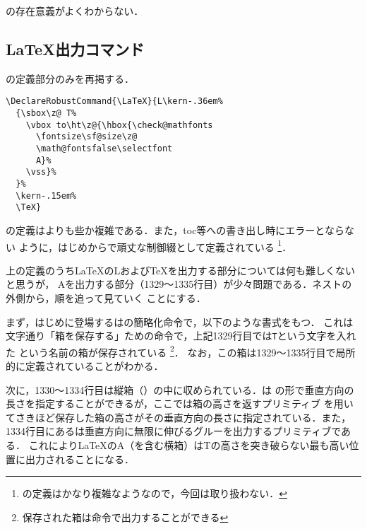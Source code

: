 \documentclass[autodetect-engine,dvipdfmx]{jsarticle}
\begin{document}
\begin{question}
の存在意義がよくわからない．
\end{question}


\newpage

\subsection{\LaTeX 出力コマンド}

の定義部分のみを再掲する．

\begin{lstlisting}[firstnumber=1328]
\DeclareRobustCommand{\LaTeX}{L\kern-.36em%
  {\sbox\z@ T%
    \vbox to\ht\z@{\hbox{\check@mathfonts
      \fontsize\sf@size\z@
      \math@fontsfalse\selectfont
      A}%
    \vss}%
  }%
  \kern-.15em%
  \TeX}
\end{lstlisting}

の定義はよりも些か複雑である．また，toc等への書き出し時にエラーとならない
ように，はじめからで頑丈な制御綴として定義されている
\footnote{の定義はかなり複雑なようなので，今回は取り扱わない．}．

上の定義のうち\LaTeX のLおよび\TeX を出力する部分については何も難しくないと思うが，
Aを出力する部分（1329〜1335行目）が少々問題である．ネストの外側から，順を追って見ていく
ことにする．

まず，はじめに登場するはの簡略化命令で，以下のような書式をもつ．
これは文字通り「箱を保存する」ための命令で，上記1329行目では\texttt{T}という文字を入れた
という名前の箱が保存されている
\footnote{保存された箱は命令で出力することができる}．
なお，この箱は1329〜1335行目で局所的に定義されていることがわかる．

次に，1330〜1334行目は縦箱（）の中に収められている．は
の形で垂直方向の長さを指定することができるが，ここでは箱の高さを返すプリミティブ
を用いてさきほど保存した箱の高さがその垂直方向の長さに指定されている．また，
1334行目にあるは垂直方向に無限に伸びるグルーを出力するプリミティブである．
これにより\LaTeX のA（を含む横箱）はTの高さを突き破らない最も高い位置に出力されることになる．
\end{document}
